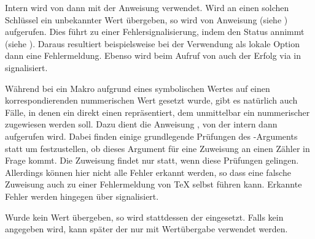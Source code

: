 Intern wird von  dann
 mit der Anweisung
 verwendet. Wird an einen solchen Schlüssel ein
unbekannter Wert übergeben, so wird von  Anweisung
 (siehe
) aufgerufen. Dies führt zu
einer Fehlersignalisierung, indem  den
Status  annimmt (siehe
). Daraus resultiert
beispielsweise bei der Verwendung als lokale Option dann eine
Fehlermeldung. Ebenso wird beim Aufruf von  auch der
Erfolg via  in
 signalisiert.%
%
\EndIndexGroup


\begin{Declaration}
\end{Declaration}
Während bei
 ein Makro aufgrund eines
symbolischen Wertes auf einen korrespondierenden nummerischen Wert
gesetzt wurde, gibt es natürlich auch Fälle, in denen ein 
direkt einen  repräsentiert, dem unmittelbar ein
nummerischer  zugewiesen werden soll. Dazu dient die Anweisung
, von der intern dann 
aufgerufen wird. Dabei finden einige grundlegende Prüfungen des
-Arguments statt um festzustellen, ob dieses Argument für eine
Zuweisung an einen Zähler in Frage kommt. Die Zuweisung findet nur statt, wenn
diese Prüfungen gelingen. Allerdings können hier nicht alle Fehler erkannt
werden, so dass eine falsche Zuweisung auch zu einer Fehlermeldung von \TeX{}
selbst führen kann. Erkannte Fehler werden hingegen über
 signalisiert.

Wurde kein Wert übergeben, so wird
stattdessen der  eingesetzt. Falls kein 
angegeben wird, kann später der  nur mit Wertübergabe
verwendet werden.%
\iffalse%
\ Anderenfalls wir mit
\DescRef{\LabelBase.cmd.FamilyKeyStateNeedValue} ein entsprechender Fehler
signalisiert und beispielsweise innerhalb \Macro{FamilyOptions}  auch als
solcher gemeldet.%
\fi%
\EndIndexGroup


